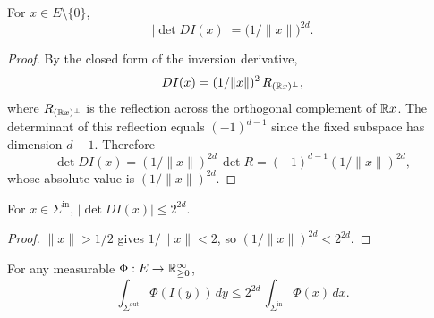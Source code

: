 \begin{lemma}
\label{lem:det-jacobian}
\leanok
For $x \in E \setminus \{0\}$,
\begin{equation*}
\bigl|\det DI(x)\bigr| = \bigl(1/\|x\|\bigr)^{2d}.
\end{equation*}
\end{lemma}

\begin{proof}
\leanok

By the closed form of the inversion derivative,
\begin{equation*}
DI(x) = (1/\|x\|)^2 \, R_{(\mathbb{R} x)^\perp},
\end{equation*}
where $R_{(\mathbb{R} x)^\perp}$ is the reflection across the orthogonal complement of
$\mathbb{R} x$. The determinant of this reflection equals $(-1)^{d-1}$ since the
fixed subspace has dimension $d-1$. Therefore
\begin{equation*}
\det DI(x) = (1/\|x\|)^{2d}\,\det R = (-1)^{d-1}(1/\|x\|)^{2d},
\end{equation*}
whose absolute value is $(1/\|x\|)^{2d}$.
\end{proof}

\begin{lemma}
\label{lem:abs_det_fderiv_inversion_zero_one_le_of_mem_innerShell}
\leanok
{}
For $x \in \Sigma^{\mathrm{in}}$, $|\det DI(x)| \le 2^{2d}$.
\end{lemma}

\begin{proof}
\leanok
{}

$\|x\| > 1/2$ gives $1/\|x\| < 2$, so $(1/\|x\|)^{2d} < 2^{2d}$.
\end{proof}

\begin{lemma}
\label{lem:cov-shell}
\leanok
{}
For any measurable $\Phi : E \to \mathbb{R}_{\ge 0}^\infty$,
\begin{equation*}
\int_{\Sigma^{\mathrm{out}}} \Phi(I(y))\,dy
\le 2^{2d}\,\int_{\Sigma^{\mathrm{in}}} \Phi(x)\,dx.
\end{equation*}
\end{lemma}

